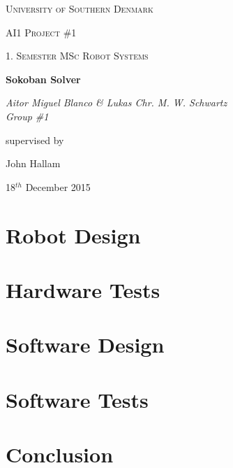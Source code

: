 \documentclass[12pt,a4paper]{article}
\begin{document}
\begin{titlepage}
	\centering
	\vfill
	{\scshape\LARGE University of Southern Denmark\par}
	\vspace{1cm}
	{\scshape\Large AI1 Project \#1\par}
	{\scshape\large 1. Semester MSc Robot Systems\par}
	\vspace{1.5cm}
	{\huge\bfseries Sokoban Solver\par}
	\vspace{2cm}
	{\Large\itshape Aitor Miguel Blanco \& Lukas Chr. M. W. Schwartz \\ Group \#1 \par}
	\vfill
	supervised by\par
	John Hallam

	\vspace{2cm}

	{\large 18$^{th}$ December 2015 \par}
\end{titlepage}

\pagebreak

\tableofcontents

\pagebreak

\listoffigures

\listoftables

\pagebreak



\pagebreak
\section{Robot Design}



\section{Hardware Tests}



\pagebreak
\section{Software Design}








\pagebreak
\section{Software Tests}



\pagebreak
\section{Conclusion}

\end{document}
